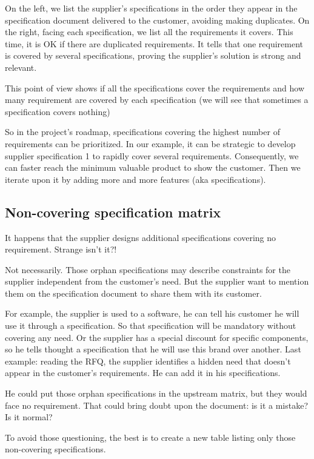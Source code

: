 On the left, we list the supplier’s specifications in the order they appear in the specification document delivered to the customer, avoiding making duplicates.
On the right, facing each specification, we list all the requirements it covers. This time, it is OK if there are duplicated requirements. It tells that one requirement is covered by several specifications, proving the supplier’s solution is strong and relevant.

This point of view shows if all the specifications cover the requirements and how many requirement are covered by each specification (we will see that sometimes a specification covers nothing)

So in the project’s roadmap, specifications covering the highest number of requirements can be prioritized. In our example, it can be strategic to develop supplier specification 1 to rapidly cover several requirements. Consequently, we can faster reach the minimum valuable product to show the customer. Then we iterate upon it by adding more and more features (aka specifications).

\subsection{Non-covering specification matrix}
It happens that the supplier designs additional specifications covering no requirement. Strange isn’t it?!

Not necessarily. Those orphan specifications may describe constraints for the supplier independent from the customer’s need. But the supplier want to mention them on the specification document to share them with its customer.

For example, the supplier is used to a software, he can tell his customer he will use it through a specification. So that specification will be mandatory without covering any need.
Or the supplier has a special discount for specific components, so he tells thought a specification that he will use this brand over another.
Last example: reading the RFQ, the supplier identifies a hidden need that doesn’t appear in the customer’s requirements. He can add it in his specifications.

He could put those orphan specifications in the upstream matrix, but they would face no requirement. That could bring doubt upon the document: is it a mistake? Is it normal?

To avoid those questioning, the best is to create a new table listing only those non-covering specifications.

